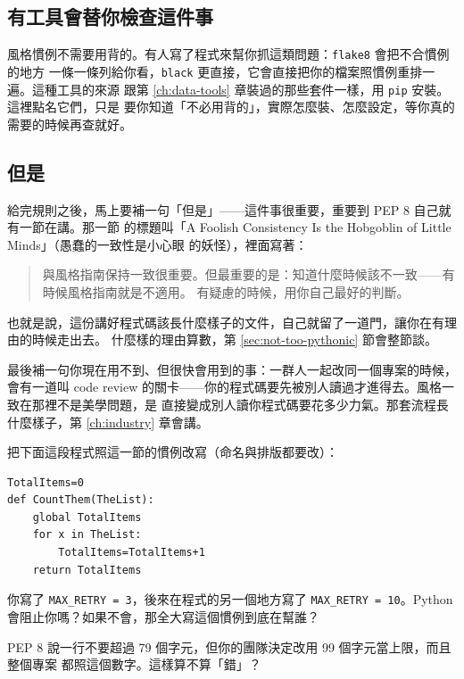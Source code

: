 
\subsection*{有工具會替你檢查這件事}

風格慣例不需要用背的。有人寫了程式來幫你抓這類問題：\texttt{flake8} 會把不合慣例的地方
一條一條列給你看，\texttt{black} 更直接，它會直接把你的檔案照慣例重排一遍。這種工具的來源
跟第 \ref{ch:data-tools} 章裝過的那些套件一樣，用 \texttt{pip} 安裝。這裡點名它們，只是
要你知道「不必用背的」，實際怎麼裝、怎麼設定，等你真的需要的時候再查就好。

\subsection*{但是}

給完規則之後，馬上要補一句「但是」——這件事很重要，重要到 PEP 8 自己就有一節在講。那一節
的標題叫「A Foolish Consistency Is the Hobgoblin of Little Minds」（愚蠢的一致性是小心眼
的妖怪），裡面寫著：

\begin{quote}
與風格指南保持一致很重要。但最重要的是：知道什麼時候該不一致——有時候風格指南就是不適用。
有疑慮的時候，用你自己最好的判斷。
\end{quote}

也就是說，這份講好程式碼該長什麼樣子的文件，自己就留了一道門，讓你在有理由的時候走出去。
什麼樣的理由算數，第 \ref{sec:not-too-pythonic} 節會整節談。

最後補一句你現在用不到、但很快會用到的事：一群人一起改同一個專案的時候，會有一道叫
code review 的關卡——你的程式碼要先被別人讀過才進得去。風格一致在那裡不是美學問題，是
直接變成別人讀你程式碼要花多少力氣。那套流程長什麼樣子，第 \ref{ch:industry} 章會講。

\begin{drills}[label=drills:pep8]
\item 把下面這段程式照這一節的慣例改寫（命名與排版都要改）：
\begin{verbatim}
TotalItems=0
def CountThem(TheList):
    global TotalItems
    for x in TheList:
        TotalItems=TotalItems+1
    return TotalItems
\end{verbatim}
\item 你寫了 \texttt{MAX\_RETRY = 3}，後來在程式的另一個地方寫了
\texttt{MAX\_RETRY = 10}。Python 會阻止你嗎？如果不會，那全大寫這個慣例到底在幫誰？
\item PEP 8 說一行不要超過 79 個字元，但你的團隊決定改用 99 個字元當上限，而且整個專案
都照這個數字。這樣算不算「錯」？
\end{drills}

